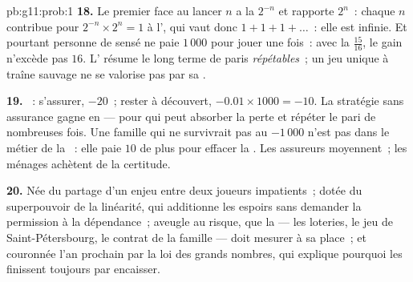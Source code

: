 \begin{solution}{pb:g11:prob:1}
\textbf{18.} Le premier face au lancer $n$ a la 
$2^{-n}$ et rapporte $2^n$~: chaque $n$ contribue pour
$2^{-n} \times 2^n = 1$ à l', qui vaut donc
$1 + 1 + 1 + \dots$~: elle est infinie. Et pourtant personne de
sensé ne paie $1\,000$ pour jouer une fois~: avec la 
$\frac{15}{16}$, le gain n'excède pas $16$. L' résume le
long terme de paris \emph{répétables}~; un jeu unique à traîne
sauvage ne se valorise pas par sa .

\textbf{19.} ~: s'assurer, $-20$~; rester à découvert,
$-0.01 \times 1000 = -10$. La stratégie sans assurance gagne en
 --- pour qui peut absorber la perte et répéter le pari de
nombreuses fois. Une famille qui ne survivrait pas au $-1\,000$
n'est pas dans le métier de la ~: elle paie $10$ de plus
pour effacer la . Les assureurs moyennent~; les ménages
achètent de la certitude.

\textbf{20.} Née du partage d'un enjeu entre deux joueurs
impatients~; dotée du superpouvoir de la linéarité, qui additionne
les espoirs sans demander la permission à la dépendance~; aveugle au
risque, que la  --- les loteries, le jeu de
Saint-Pétersbourg, le contrat de la famille --- doit mesurer à sa
place~; et couronnée l'an prochain par la loi des grands nombres,
qui explique pourquoi les  finissent toujours par
encaisser.
\end{solution}
